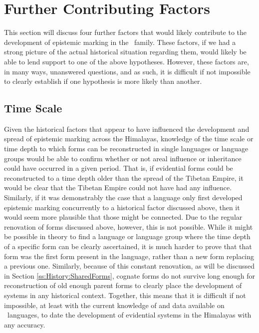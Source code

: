 \section{Further Contributing Factors}\label{s:History:FurtherFactors}
This section will discuss four further factors that would likely contribute to the development of epistemic marking in the \lfam\ family. These factors, if we had a strong picture of the actual historical situation regarding them, would likely be able to lend support to one of the above hypotheses. However, these factors are, in many ways, unanswered questions, and as such, it is difficult if not impossible to clearly establish if one hypothesis is more likely than another.
\subsection{Time Scale}
Given the historical factors that appear to have influenced the development and spread of epistemic marking across the Himalayas, knowledge of the time scale or time depth to which forms can be reconstructed in single languages or language groups would be able to confirm whether or not areal influence or inheritance could have occurred in a given period. That is, if evidential forms could be reconstructed to a time depth older than the spread of the Tibetan Empire, it would be clear that the Tibetan Empire could not have had any influence. Similarly, if it was demonstrably the case that a language only first developed epistemic marking concurrently to a historical factor discussed above, then it would seem more plausible that those might be connected. Due to the regular renovation of forms discussed above, however, this is not possible. While it might be possible in theory to find a language or language group where the time depth of a specific form can be clearly ascertained, it is much harder to prove that that form was the first form present in the language, rather than a new form replacing a previous one. Similarly, because of this constant renovation, as will be discussed in Section \ref{ss:History:SharedForms}, cognate forms do not survive long enough for reconstruction of old enough parent forms to clearly place the development of systems in any historical context. Together, this means that it is difficult if not impossible, at least with the current knowledge of and data available on \lfam\ languages, to date the development of evidential systems in the Himalayas with any accuracy.
